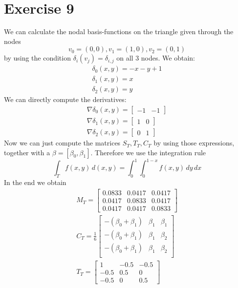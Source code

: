 \documentclass[oneside,a4paper]{amsart}
\begin{document}
\section*{Exercise 9}
We can calculate the nodal basis-functions on the triangle given through the nodes 
\[
	v_0=(0,0), v_1=(1,0), v_2=(0,1)
\]
by using the condition $\delta_i(v_j) = \delta_{i,j}$ on all 3 nodes. We obtain:
	\begin{eqnarray*}
		\delta_0(x,y) = -x -y +1\\
		\delta_1(x,y) = x\\
		\delta_2(x,y) = y
	\end{eqnarray*}
	We can directly compute the derivatives:
	\begin{eqnarray*}
		\nabla\delta_0(x,y) = \begin{bmatrix} -1&-1\end{bmatrix}\\
		\nabla\delta_1(x,y) = \begin{bmatrix} 1&0\end{bmatrix}\\
		\nabla\delta_2(x,y) = \begin{bmatrix} 0&1\end{bmatrix}
	\end{eqnarray*}
	Now we can just compute the matrices $S_T,T_T,C_T$ by using those expressions, together with a $\beta=[\beta_0,\beta_1]$. Therefore we use the integration rule
	\[
		\int_T f(x,y)\,d(x,y) = \int_0^1\int_0^{1-x} f(x,y)\,dy\,dx
	\]In the end we obtain
	\begin{eqnarray*}
		M_T = 	\begin{bmatrix}
					0.0833 & 0.0417 & 0.0417\\
					0.0417 & 0.0833 & 0.0417\\
					0.0417 & 0.0417 & 0.0833 
				\end{bmatrix}
				\\
		C_T = 	\frac{1}{6}\begin{bmatrix}
					-(\beta_0+\beta_1) & \beta_1 & \beta_1 \\
					-(\beta_0+\beta_1) & \beta_1 & \beta_2 \\
					-(\beta_0+\beta_1) & \beta_1 & \beta_2 \\
				\end{bmatrix}
				\\
		T_T = 	\begin{bmatrix}
					1 & -0.5 & -0.5\\
					-0.5 & 0.5 & 0\\
					-0.5 & 0 & 0.5
				\end{bmatrix}
	\end{eqnarray*}
\end{document}

